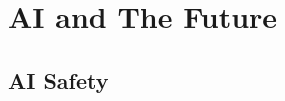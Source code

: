 \documentclass[../../../main.tex]{subfiles}
\begin{document}
\chapter{AI and The Future}





\section{AI Safety}
\end{document}

